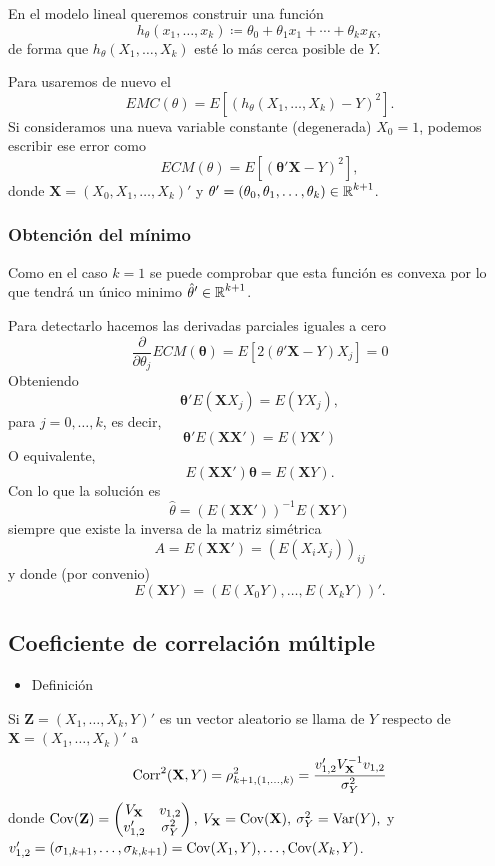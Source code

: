 En el modelo lineal queremos construir una función \[ h_\theta(x_1,\dots,x_k)\coloneq\theta_0+\theta_1x_1+\cdots+\theta_kx_K, \]de forma que $h_\theta(X_1,\dots,X_k)$ esté lo más cerca posible de $Y$.

Para  usaremos de nuevo el  \[ EMC(\theta)=E\left[(h_\theta(X_1,\dots,X_k)-Y)^2\right]. \]
Si consideramos una nueva variable constante (degenerada) $X_0=1$, podemos escribir ese error como \[ ECM(\theta)=E\left[(\mathbf{\theta'X}-Y)^2\right], \] donde $\mathbf{X}=(X_0,X_1,\dots,X_k)'$ y $\mathbf{\theta'}=(\theta_0,\theta_1,\dots,\theta_k)\in\operatorname{\mathbb{R}}^{k+1}$.
\subsubsection{Obtención del mínimo}
Como en el caso $k=1$ se puede comprobar que esta función es convexa por lo que tendrá un único minimo $\hat{\theta}'\in\operatorname{\mathbb{R}}^{k+1}$.

Para detectarlo hacemos las derivadas parciales iguales a cero \[ \dfrac{\partial}{\partial\theta_j}ECM(\mathbf{\theta})=E[2(\theta'\mathbf{X}-Y)X_j]=0 \]
Obteniendo \[ \mathbf{\theta}'E(\mathbf{X}X_j)=E(YX_j), \]para $j=0,\dots,k$, es decir, \[ \mathbf{\theta}'E(\mathbf{XX'})=E(Y\mathbf{X}') \]
O equivalente, \[ E(\mathbf{XX'})\mathbf{\theta}=E(\mathbf{X}Y). \]
Con lo que la solución es \[ \hat{\theta}=(E(\mathbf{XX'}))^{-1}E(\mathbf{X}Y) \]siempre que existe la inversa de la matriz simétrica \[ A=E(\mathbf{XX'})=(E(X_iX_j))_{ij} \]y donde (por convenio)\[ E(\mathbf{X}Y)=(E(X_0Y),\dots,E(X_kY))'. \]
\subsection{Coeficiente de correlación múltiple}
\begin{itemize}[label=\color{red}\textbullet, leftmargin=*]
	\item \color{lightblue}Definición
\end{itemize}
Si $\mathbf{Z}=(X_1,\dots,X_k,Y)'$ es un vector aleatorio se llama  de $Y$ respecto de $\mathbf{X}=(X_1,\dots,X_k)'$ a \[ \operatorname{Corr}^2(\mathbf{X},Y)=\rho_{k+1,(1,\dots,k)}^2=\dfrac{v_{1,2}'V_\mathbf{X}^{-1}v_{1,2}}{\sigma_Y^2} \]donde $\operatorname{Cov}(\mathbf{Z})=\begin{pmatrix}
	V_\mathbf{X} & v_{1,2}\\
	v_{1,2}' & \sigma_Y^2
\end{pmatrix},\:V_\mathbf{X}=\operatorname{Cov}(\mathbf{X}),\:\sigma_Y^2=\operatorname{Var}(Y),$ y $v_{1,2}'=(\sigma_{1,k+1},\dots,\sigma_{k,k+1})=\operatorname{Cov}(X_1,Y),\dots,\operatorname{Cov}(X_k,Y)$.

